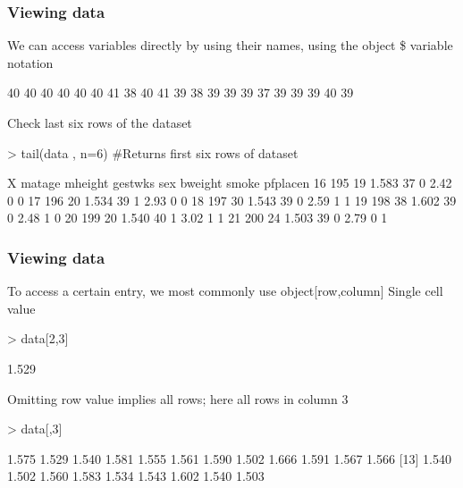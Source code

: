 \documentclass{beamer}
\begin{document}
\begin{frame}[fragile]\frametitle{Viewing data}
\small

We can access variables directly by using their names, using the object \$ variable notation

\begin{Schunk}
\begin{Soutput}
 [1] 40 40 40 40 40 40 41 38 40 41 39 38 39 39 39 37 39 39 39 40 39
\end{Soutput}
\end{Schunk}

Check last six rows of the dataset
\begin{Schunk}
\begin{Sinput}
> tail(data , n=6) #Returns first six rows of dataset
\end{Sinput}
\begin{Soutput}
     X matage mheight gestwks sex bweight smoke pfplacen
16 195     19   1.583      37   0    2.42     0        0
17 196     20   1.534      39   1    2.93     0        0
18 197     30   1.543      39   0    2.59     1        1
19 198     38   1.602      39   0    2.48     1        0
20 199     20   1.540      40   1    3.02     1        1
21 200     24   1.503      39   0    2.79     0        1
\end{Soutput}
\end{Schunk}
\end{frame}
% 
\begin{frame}[fragile]\frametitle{Viewing data}
To access a certain entry, we most commonly use object[row,column]
Single cell value
\begin{Schunk}
\begin{Sinput}
> data[2,3]    
\end{Sinput}
\begin{Soutput}
[1] 1.529
\end{Soutput}
\end{Schunk}
Omitting row value implies all rows; here all rows in column 3
\begin{Schunk}
\begin{Sinput}
> data[,3]
\end{Sinput}
\begin{Soutput}
 [1] 1.575 1.529 1.540 1.581 1.555 1.561 1.590 1.502 1.666 1.591 1.567 1.566
[13] 1.540 1.502 1.560 1.583 1.534 1.543 1.602 1.540 1.503
\end{Soutput}
\end{Schunk}
\end{frame}
\end{document}
